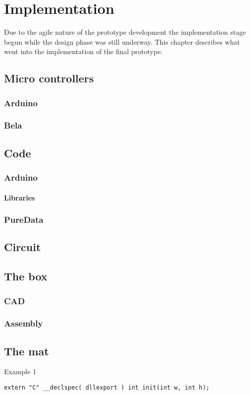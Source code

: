 \chapter{Implementation}%
Due to the agile nature of the prototype development the implementation stage begun while the design phase was still underway. This chapter describes what went into the implementation of the final prototype.

\section{Micro controllers}%

	\subsection{Arduino}%
		
		
	\subsection{Bela}%
		
	
\section{Code}
	\subsection{Arduino}%
		\subsubsection{Libraries}%
	\subsection{PureData}%
		
	
\section{Circuit}


\section{The box}%

	\subsection{CAD}
		
	\subsection{Assembly}

\section{The mat}%

\begin{listing}[H]
	\caption{Example 1}
	\label{listing:example1}
	\begin{verbatim}
extern "C" __declspec( dllexport ) int init(int w, int h);
	\end{verbatim}
\end{listing}
